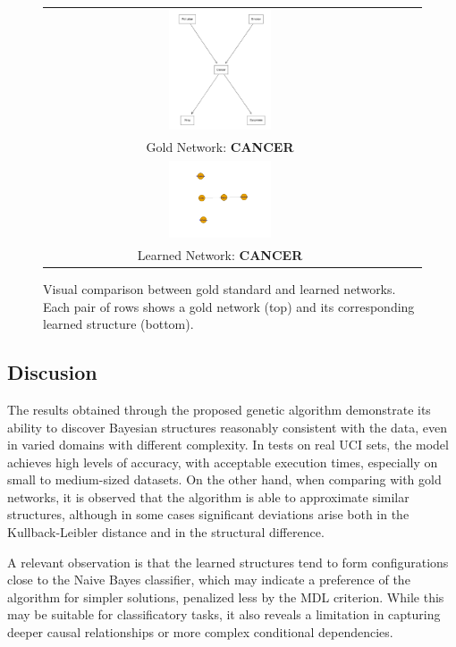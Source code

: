 \documentclass[runningheads]{llncs}
\begin{document}
\begin{figure}[H]
\begin{tabular}{ccc}
		\includegraphics[width=0.3\textwidth]{IMG/G2.png} & & \\
		Gold Network: \textbf{CANCER} & & \\
		\includegraphics[width=0.3\textwidth]{IMG/7gr.png} & & \\
		Learned Network: \textbf{CANCER} & &
	\end{tabular}
	\caption{Visual comparison between gold standard and learned networks. Each pair of rows shows a gold network (top) and its corresponding learned structure (bottom).}
	\label{fig:network_comparison_ordered}
\end{figure}


\newpage

\subsection{Discusion}

The results obtained through the proposed genetic algorithm demonstrate its ability to discover Bayesian structures reasonably consistent with the data, even in varied domains with different complexity. In tests on real UCI sets, the model achieves high levels of accuracy, with acceptable execution times, especially on small to medium-sized datasets. On the other hand, when comparing with gold networks, it is observed that the algorithm is able to approximate similar structures, although in some cases significant deviations arise both in the Kullback-Leibler distance and in the structural difference.

A relevant observation is that the learned structures tend to form configurations close to the Naive Bayes classifier, which may indicate a preference of the algorithm for simpler solutions, penalized less by the MDL criterion. While this may be suitable for classificatory tasks, it also reveals a limitation in capturing deeper causal relationships or more complex conditional dependencies.
\end{document}
